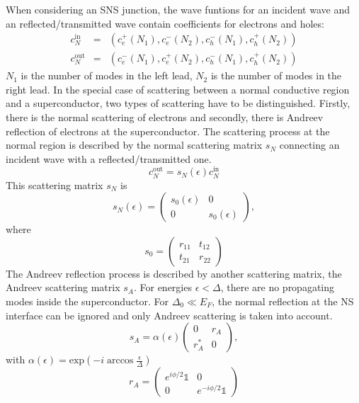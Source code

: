 When considering an SNS junction, the wave funtions for an incident wave and an reflected/transmitted wave contain coefficients for electrons and holes:
\begin{eqnarray}
c_N^\text{in} &=& \left( c^+_e(N_1), c^-_e(N_2), c^-_h(N_1), c^+_h(N_2) \right) \\
c_N^\text{out} &=& \left( c^-_e(N_1), c^+_e(N_2), c^-_h(N_1), c^+_h(N_2) \right)
\end{eqnarray}
$N_1$ is the number of modes in the left lead, $N_2$ is the number of modes in the right lead. In the special case of scattering between a normal conductive region and a superconductor, two types of scattering have to be distinguished. Firstly, there is the normal scattering of electrons and secondly, there is Andreev reflection of electrons at the superconductor. The scattering process at the normal region is described by the normal scattering matrix $s_N$ connecting an incident wave with a reflected/transmitted one.
\begin{equation}
c^\text{out}_N = s_N(\epsilon) c^\text{in}_N
\end{equation}
This scattering matrix $s_N$ is
\begin{equation}
s_N (\epsilon) = \begin{pmatrix} s_0 (\epsilon ) & 0  \\ 0 & s_0 ( \epsilon) \end{pmatrix} \label{eq:s-n},
\end{equation}
where
\begin{equation}
s_0 = \begin{pmatrix} r_{1 1} & t_{1 2} \\ t_{2 1} & r_{2 2} \end{pmatrix}
\end{equation}
The Andreev reflection process is described by another scattering matrix, the Andreev scattering matrix $s_A$. For  energies $\epsilon < \Delta$, there are no propagating modes inside the superconductor. For $\Delta_0 \ll E_F$, the normal reflection at the NS interface can be ignored and only Andreev scattering is taken into account.
\begin{equation}
s_A = \alpha(\epsilon) \begin{pmatrix} 0 & r_A \\ r_A^* & 0 \end{pmatrix}, 
\end{equation}
with $\alpha ( \epsilon ) = \text{exp} \left( -i \arccos \frac{\epsilon}{\Delta} \right) $
\begin{equation}
r_A = \begin{pmatrix} e^{i \phi /2 } \mathds{1} & 0 \\ 0 & e^{-i \phi / 2 } \mathds{1} \end{pmatrix}
\end{equation}
